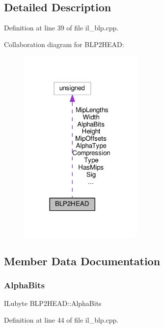 \subsection{Detailed Description}


Definition at line 39 of file il\+\_\+blp.\+cpp.



Collaboration diagram for B\+L\+P2\+H\+E\+AD\+:
\nopagebreak
\begin{figure}[H]
\begin{center}
\leavevmode
\includegraphics[width=173pt]{d6/d1a/structBLP2HEAD__coll__graph}
\end{center}
\end{figure}


\subsection{Member Data Documentation}
\mbox{\label{structBLP2HEAD_a9ef13881e74229d0e70e1f4aae44658c}} 
\subsubsection{\texorpdfstring{Alpha\+Bits}{AlphaBits}}
{\footnotesize\ttfamily I\+Lubyte B\+L\+P2\+H\+E\+A\+D\+::\+Alpha\+Bits}



Definition at line 44 of file il\+\_\+blp.\+cpp.

